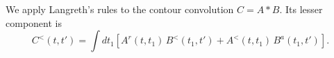 \documentclass{article}
\begin{document}
We apply Langreth's rules to the contour convolution $C = A * B$. Its lesser component is
\begin{equation}
C^{<}(t,t') = \int dt_1 \left[ A^{r}(t,t_1)\, B^{<}(t_1,t') + A^{<}(t,t_1)\, B^{a}(t_1,t') \right] .
\label{eq:lang}
\end{equation}
\end{document}
